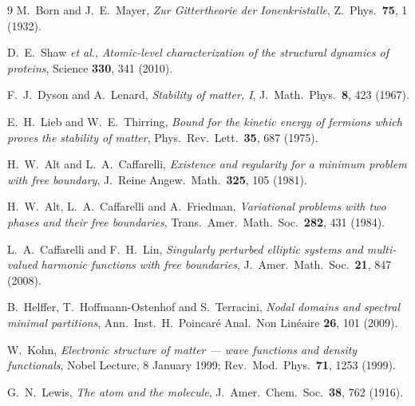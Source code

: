 \documentclass[11pt]{article}
\begin{document}
\begin{thebibliography}{9}
M.~Born and J.~E.~Mayer,
\emph{Zur Gittertheorie der Ionenkristalle},
Z.~Phys.\ \textbf{75}, 1 (1932).

D.~E.~Shaw \emph{et al.},
\emph{Atomic-level characterization of the structural dynamics of proteins},
Science \textbf{330}, 341 (2010).

F.~J.~Dyson and A.~Lenard,
\emph{Stability of matter, I},
J.\ Math.\ Phys.\ \textbf{8}, 423 (1967).

E.~H.~Lieb and W.~E.~Thirring,
\emph{Bound for the kinetic energy of fermions which proves the stability of matter},
Phys.\ Rev.\ Lett.\ \textbf{35}, 687 (1975).

H.~W.~Alt and L.~A.~Caffarelli,
\emph{Existence and regularity for a minimum problem with free boundary},
J.\ Reine Angew.\ Math.\ \textbf{325}, 105 (1981).

H.~W.~Alt, L.~A.~Caffarelli and A.~Friedman,
\emph{Variational problems with two phases and their free boundaries},
Trans.\ Amer.\ Math.\ Soc.\ \textbf{282}, 431 (1984).

L.~A.~Caffarelli and F.~H.~Lin,
\emph{Singularly perturbed elliptic systems and multi-valued harmonic functions with free boundaries},
J.\ Amer.\ Math.\ Soc.\ \textbf{21}, 847 (2008).

B.~Helffer, T.~Hoffmann-Ostenhof and S.~Terracini,
\emph{Nodal domains and spectral minimal partitions},
Ann.\ Inst.\ H.\ Poincar\'e Anal.\ Non Lin\'eaire \textbf{26}, 101 (2009).

W.~Kohn,
\emph{Electronic structure of matter --- wave functions and density functionals},
Nobel Lecture, 8 January 1999;
Rev.\ Mod.\ Phys.\ \textbf{71}, 1253 (1999).

G.~N.~Lewis,
\emph{The atom and the molecule},
J.\ Amer.\ Chem.\ Soc.\ \textbf{38}, 762 (1916).

\end{thebibliography}
\end{document}
